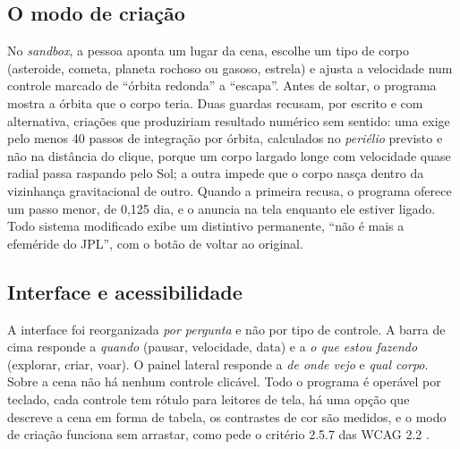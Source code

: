 \subsection{O modo de criação}

No \emph{sandbox}, a pessoa aponta um lugar da cena, escolhe um tipo de corpo (asteroide, cometa, planeta rochoso ou gasoso, estrela) e ajusta a velocidade num controle marcado de ``órbita redonda'' a ``escapa''. Antes de soltar, o programa mostra a órbita que o corpo teria. Duas guardas recusam, por escrito e com alternativa, criações que produziriam resultado numérico sem sentido: uma exige pelo menos 40 passos de integração por órbita, calculados no \emph{periélio} previsto e não na distância do clique, porque um corpo largado longe com velocidade quase radial passa raspando pelo Sol; a outra impede que o corpo nasça dentro da vizinhança gravitacional de outro. Quando a primeira recusa, o programa oferece um passo menor, de 0,125 dia, e o anuncia na tela enquanto ele estiver ligado. Todo sistema modificado exibe um distintivo permanente, ``não é mais a efeméride do JPL'', com o botão de voltar ao original.

\subsection{Interface e acessibilidade}

A interface foi reorganizada \emph{por pergunta} e não por tipo de controle. A barra de cima responde a \emph{quando} (pausar, velocidade, data) e a \emph{o que estou fazendo} (explorar, criar, voar). O painel lateral responde a \emph{de onde vejo} e \emph{qual corpo}. Sobre a cena não há nenhum controle clicável. Todo o programa é operável por teclado, cada controle tem rótulo para leitores de tela, há uma opção que descreve a cena em forma de tabela, os contrastes de cor são medidos, e o modo de criação funciona sem arrastar, como pede o critério 2.5.7 das WCAG 2.2 \cite{wcag22}.
